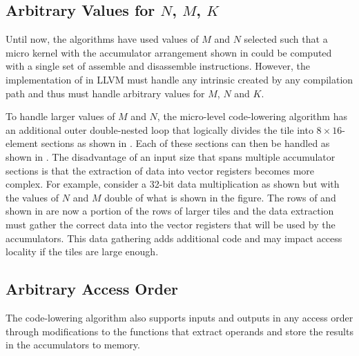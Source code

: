 \documentclass[\main/thesis.tex]{subfiles}
\begin{document}
\subsection{Arbitrary Values for $N$, $M$, $K$}
\label{sec:arbitraryDims}
Until now, the algorithms have used values of $M$ and $N$ selected such that a micro kernel with the accumulator arrangement shown in  could be computed with a single set of assemble and disassemble instructions.
However, the implementation of  in LLVM must handle any  intrinsic created by any compilation path and thus must handle arbitrary values for $M$, $N$ and $K$.

To handle larger values of $M$ and $N$, the micro-level code-lowering algorithm has an additional outer double-nested loop that logically divides the  tile into $8 \times 16$-element sections as shown in .
Each of these sections can then be handled as shown in .
The disadvantage of an input size that spans multiple accumulator sections is that the extraction of data into vector registers becomes more complex.
For example, consider a 32-bit data multiplication as shown  but with the values of $N$ and $M$ double of what is shown in the figure.
The rows of  and  shown in  are now a portion of the rows of larger tiles and the data extraction must gather the correct data into the vector registers that will be used by the accumulators.
This data gathering adds additional code and may impact access locality if the tiles are large enough.

\subsection{Arbitrary Access Order}
\label{sec:arbitraryOrder}
The code-lowering algorithm also supports inputs and outputs in any access order through modifications to the functions that extract operands and store the results in the accumulators to memory.
\end{document}
